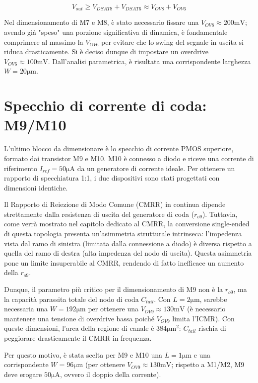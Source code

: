 \documentclass[12pt,a4paper,twoside]{report}
\begin{document}
$$V_{out} \ge V_{DSAT8} + V_{DSAT6} \approx V_{OV8} + V_{OV6}$$



\vspace{0.3cm}


\noindent Nel dimensionamento di M7 e M8, è stato necessario fissare una $V_{OV8} \approx 200\mathrm{mV}$; avendo già "speso" una porzione significativa di dinamica, è fondamentale comprimere al massimo la $V_{OV6}$ per evitare che lo swing del segnale in uscita si riduca drasticamente. Si è deciso dunque di impostare un overdrive $V_{OV6} \approx 100\mathrm{mV}$. Dall'analisi parametrica, è risultata una corrispondente larghezza $W = 20\mathrm{\mu m}$.

\section{Specchio di corrente di coda: M9/M10}

L'ultimo blocco da dimensionare è lo specchio di corrente PMOS superiore, formato dai transistor M9 e M10. M10 è connesso a diodo e riceve una corrente di riferimento $I_{ref}=50\mathrm{\mu A}$ da un generatore di corrente ideale. Per ottenere un rapporto di specchiatura 1:1, i due dispositivi sono stati progettati con dimensioni identiche.

Il Rapporto di Reiezione di Modo Comune (CMRR) in continua dipende strettamente dalla resistenza di uscita del generatore di coda ($r_{o9}$). Tuttavia, come verrà mostrato nel capitolo dedicato al CMRR, la conversione single-ended di questa topologia presenta un'asimmetria strutturale intrinseca: l'impedenza vista dal ramo di sinistra (limitata dalla connessione a diodo) è diversa rispetto a quella del ramo di destra (alta impedenza del nodo di uscita). Questa asimmetria pone un limite insuperabile al CMRR, rendendo di fatto inefficace un aumento della $r_{o9}$.

\noindent Dunque, il parametro più critico per il dimensionamento di M9 non è la $r_{o9}$, ma la capacità parassita totale del nodo di coda $C_{tail}$. Con $L=2\mathrm{\mu m}$, sarebbe necessaria una $W=192\mathrm{\mu m}$ per ottenere una $V_{OV9} \approx 130\mathrm{mV}$ (è necessario mantenere una tensione di overdrive bassa poiché $V_{OV9}$ limita l'ICMR). Con queste dimensioni, l'area della regione di canale è $384\mathrm{\mu m^2}$: $C_{tail}$ rischia di peggiorare drasticamente il CMRR in frequenza.

Per questo motivo, è stata scelta per M9 e M10 una $L=1\mathrm{\mu m}$ e una corrispondente $W=96\mathrm{\mu m}$ (per ottenere $V_{OV9} \approx 130\mathrm{mV}$; rispetto a M1/M2, M9 deve erogare $50\mathrm{\mu A}$, ovvero il doppio della corrente).
\end{document}
